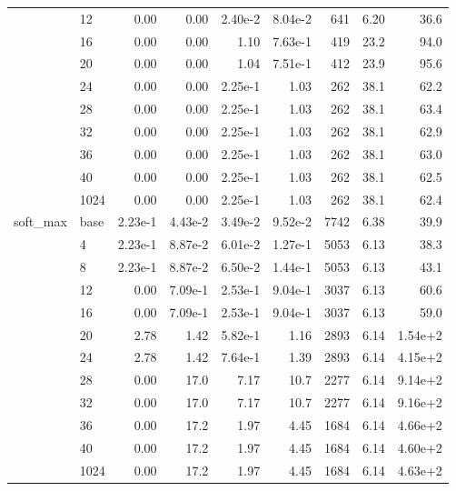 \begin{longtable}{llrrrrrrr}
\cmidrule{2-9}
         & 12   &   0.00 & 0.00 & 2.40e-2 & 8.04e-2 &     641 &     6.20 & 36.6 \\
\cmidrule{2-9}
         & 16   &   0.00 & 0.00 & 1.10 & 7.63e-1 &     419 &     23.2 & 94.0 \\
\cmidrule{2-9}
         & 20   &   0.00 & 0.00 & 1.04 & 7.51e-1 &     412 &     23.9 & 95.6 \\
\cmidrule{2-9}
         & 24   &   0.00 & 0.00 & 2.25e-1 & 1.03 &     262 &     38.1 & 62.2 \\
\cmidrule{2-9}
         & 28   &   0.00 & 0.00 & 2.25e-1 & 1.03 &     262 &     38.1 & 63.4 \\
\cmidrule{2-9}
         & 32   &   0.00 & 0.00 & 2.25e-1 & 1.03 &     262 &     38.1 & 62.9 \\
\cmidrule{2-9}
         & 36   &   0.00 & 0.00 & 2.25e-1 & 1.03 &     262 &     38.1 & 63.0 \\
\cmidrule{2-9}
         & 40   &   0.00 & 0.00 & 2.25e-1 & 1.03 &     262 &     38.1 & 62.5 \\
\cmidrule{2-9}
         & 1024 &   0.00 & 0.00 & 2.25e-1 & 1.03 &     262 &     38.1 & 62.4 \\
\midrule
soft\_max & base &   2.23e-1 & 4.43e-2 & 3.49e-2 & 9.52e-2 &    7742 &     6.38 & 39.9 \\
\cmidrule{2-9}
         & 4    &   2.23e-1 & 8.87e-2 & 6.01e-2 & 1.27e-1 &    5053 &     6.13 & 38.3 \\
\cmidrule{2-9}
         & 8    &   2.23e-1 & 8.87e-2 & 6.50e-2 & 1.44e-1 &    5053 &     6.13 & 43.1 \\
\cmidrule{2-9}
         & 12   &   0.00 & 7.09e-1 & 2.53e-1 & 9.04e-1 &    3037 &     6.13 & 60.6 \\
\cmidrule{2-9}
         & 16   &   0.00 & 7.09e-1 & 2.53e-1 & 9.04e-1 &    3037 &     6.13 & 59.0 \\
\cmidrule{2-9}
         & 20   &   2.78 & 1.42 & 5.82e-1 & 1.16 &    2893 &     6.14 & 1.54e+2 \\
\cmidrule{2-9}
         & 24   &   2.78 & 1.42 & 7.64e-1 & 1.39 &    2893 &     6.14 & 4.15e+2 \\
\cmidrule{2-9}
         & 28   &   0.00 & 17.0 & 7.17 & 10.7 &    2277 &     6.14 & 9.14e+2 \\
\cmidrule{2-9}
         & 32   &   0.00 & 17.0 & 7.17 & 10.7 &    2277 &     6.14 & 9.16e+2 \\
\cmidrule{2-9}
         & 36   &   0.00 & 17.2 & 1.97 & 4.45 &    1684 &     6.14 & 4.66e+2 \\
\cmidrule{2-9}
         & 40   &   0.00 & 17.2 & 1.97 & 4.45 &    1684 &     6.14 & 4.60e+2 \\
\cmidrule{2-9}
         & 1024 &   0.00 & 17.2 & 1.97 & 4.45 &    1684 &     6.14 & 4.63e+2 \\
\end{longtable}

